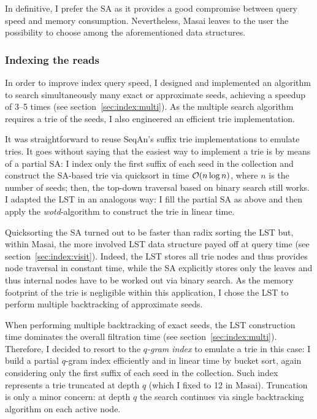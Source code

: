 In definitive, I prefer the SA as it provides a good compromise between query speed and memory consumption.
Nevertheless, Masai leaves to the user the possibility to choose among the aforementioned data structures.

\subsubsection{Indexing the reads}

In order to improve index query speed, I designed and implemented an algorithm to search simultaneously many exact or approximate seeds, achieving a speedup of 3--5 times (see section~\ref{sec:index:multi}).
As the multiple search algorithm requires a trie of the seeds, I also engineered an efficient trie implementation.

It was straightforward to reuse SeqAn's suffix trie implementations to emulate tries.
It goes without saying that the easiest way to implement a trie is by means of a partial SA:
I index only the first suffix of each seed in the collection and construct the SA-based trie via quicksort in time $\mathcal{O}(n \log n)$, where $n$ is the number of seeds; then, the top-down traversal based on binary search still works.
I adapted the LST in an analogous way: I fill the partial SA as above and then apply the \emph{wotd}-algorithm \citep{Giegerich1999} to construct the trie in linear time.

Quicksorting the SA turned out to be faster than radix sorting the LST but, within Masai, the more involved LST data structure payed off at query time (see section~\ref{sec:index:visit}).
Indeed, the LST stores all trie nodes and thus provides node traversal in constant time, while the SA explicitly stores only the leaves and thus internal nodes have to be worked out via binary search.
As the memory footprint of the trie is negligible within this application, I chose the LST to perform multiple backtracking of approximate seeds.

When performing multiple backtracking of exact seeds, the LST construction time dominates the overall filtration time (see section~\ref{sec:index:multi}).
Therefore, I decided to resort to the \emph{$q$-gram index} to emulate a trie in this case:
I build a partial $q$-gram index efficiently and in linear time by bucket sort, again considering only the first suffix of each seed in the collection.
Such index represents a trie truncated at depth $q$ (which I fixed to 12 in Masai).
Truncation is only a minor concern: at depth $q$ the search continues via single backtracking algorithm on each active node.

